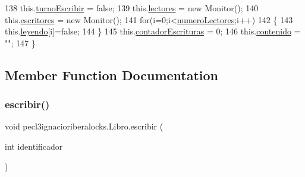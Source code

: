 \begin{DoxyCode}
138         this.\mbox{\hyperlink{classpecl3ignacioriberalocks_1_1_libro_a9f34d1b5656405e993083bd5f1bb1a27}{turnoEscribir}} = \textcolor{keyword}{false};
139         this.\mbox{\hyperlink{classpecl3ignacioriberalocks_1_1_libro_a9a3f7e435b4f83a7479dc1cdd7c79027}{lectores}} = \textcolor{keyword}{new} Monitor();
140         this.\mbox{\hyperlink{classpecl3ignacioriberalocks_1_1_libro_a24ec713d35d88ddc71ea9ca21d8b93ac}{escritores}} = \textcolor{keyword}{new} Monitor();
141         \textcolor{keywordflow}{for}(i=0;i<\mbox{\hyperlink{classpecl3ignacioriberalocks_1_1_libro_a7c53211c6562aff8e31edf3e76882bc7}{numeroLectores}};i++)
142         \{
143             this.\mbox{\hyperlink{classpecl3ignacioriberalocks_1_1_libro_a07b101f066333c63dad3cd1ef98c1a5d}{leyendo}}[i]=\textcolor{keyword}{false};
144         \}
145         this.\mbox{\hyperlink{classpecl3ignacioriberalocks_1_1_libro_a5d06fe0f5003ffac5e6e1cc8713debe6}{contadorEscrituras}} = 0;
146         this.\mbox{\hyperlink{classpecl3ignacioriberalocks_1_1_libro_a5da87c57f21f55953a8b839be533260e}{contenido}} = \textcolor{stringliteral}{""};
147     \}
\end{DoxyCode}


\subsection{Member Function Documentation}
\mbox{\label{classpecl3ignacioriberalocks_1_1_libro_ab122d519b84415808a92fd4582cc47d3}} 
\subsubsection{\texorpdfstring{escribir()}{escribir()}}
{\footnotesize\ttfamily void pecl3ignacioriberalocks.\+Libro.\+escribir (\begin{DoxyParamCaption}\item[{int}]{identificador }\end{DoxyParamCaption})\hspace{0.3cm}{\ttfamily [inline]}}


